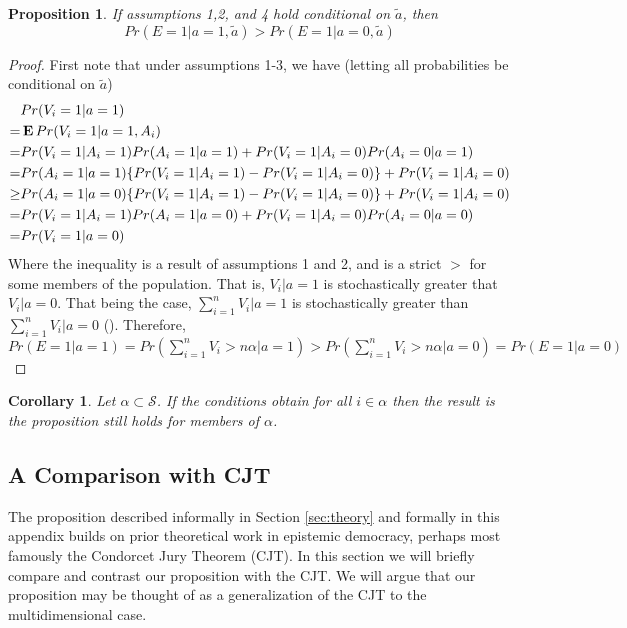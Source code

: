 \documentclass[11pt]{article}
\newcommand{\E}{\mathop{\bf E\/}}
\newtheorem*{prop*}{Proposition}
\newtheorem{cor}{Corollary}
\begin{document}
\begin{prop*}
If assumptions 1,2, and 4 hold conditional on $\tilde{a}$, then
\begin{equation}
Pr(E=1|a=1,\tilde{a})>Pr(E=1|a=0,\tilde{a})
\end{equation}
\end{prop*}

\begin{proof}
First note that
under assumptions 1-3, we have (letting all probabilities be conditional on $\tilde{a}$)
\begin{align*}
&Pr(V_i=1|a=1)\\
=&\E Pr(V_i=1|a=1,A_i)\\
=&Pr(V_i=1|A_i=1)Pr(A_i=1|a=1)+Pr(V_i=1|A_i=0)Pr(A_i=0|a=1)\\
=&Pr(A_i=1|a=1)\{Pr(V_i=1|A_i=1)-Pr(V_i=1|A_i=0)\}+Pr(V_i=1|A_i=0)\\
\ge&Pr(A_i=1|a=0)\{Pr(V_i=1|A_i=1)-Pr(V_i=1|A_i=0)\}+Pr(V_i=1|A_i=0)\\
=&Pr(V_i=1|A_i=1)Pr(A_i=1|a=0)+Pr(V_i=1|A_i=0)Pr(A_i=0|a=0)\\
=&Pr(V_i=1|a=0)
\end{align*}
Where the inequality is a result of assumptions 1 and 2, and is a strict $>$ for some members of the population.
That is, $V_i|a=1$ is stochastically greater that $V_i|a=0$. That being the case, $\sum_{i=1}^n V_i |a=1$ is stochastically greater than $\sum_{i=1}^n V_i |a=0$ (\citet{shaked2007stochastic}).
Therefore, $Pr(E=1|a=1)=Pr(\sum_{i=1}^n V_i >n\alpha|a=1)>Pr(\sum_{i=1}^n V_i>n\alpha |a=0)=Pr(E=1|a=0)$
\end{proof}

\begin{cor}
Let $\alpha \subset \mathcal{S}$. If the conditions obtain for all $i\in\alpha$ then the result is the proposition still holds for members of $\alpha$.
\end{cor}

\subsection{A Comparison with CJT}\label{sec:cjt-compare}

The proposition described informally in Section \ref{sec:theory} and formally in this appendix builds on prior theoretical work in epistemic democracy, perhaps most famously the Condorcet Jury Theorem (CJT).
In this section we will briefly compare and contrast our proposition with the CJT.
We will argue that our proposition may be thought of as a generalization of the CJT to the multidimensional case.
\end{document}
